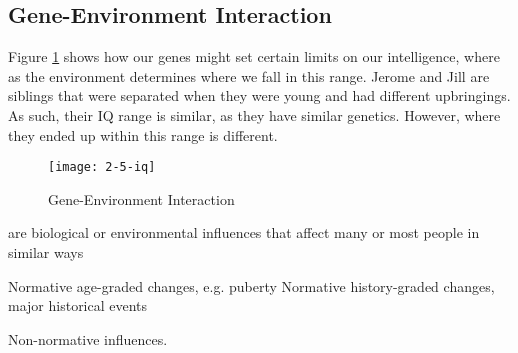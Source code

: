\documentclass[../main/main.tex]{subfiles}
\begin{document}
\subsection{Gene-Environment Interaction}
Figure \ref{2-5-iq} shows how our genes might set certain limits on our intelligence, where as the environment determines where we fall in this range. Jerome and Jill are siblings that were separated when they were young and had different upbringings. As such, their IQ range is similar, as they have similar genetics. However, where they ended up within this range is different.
\begin{figure}[htpb]
  \centering
  \texttt{[image: 2-5-iq]}
  \caption{Gene-Environment Interaction}
  \label{2-5-iq}
\end{figure}


\begin{definition}
 are biological or environmental influences that affect many or most people in similar ways
\end{definition}
Normative age-graded changes, e.g. puberty
Normative history-graded changes, major historical events

Non-normative influences.
\end{document}
